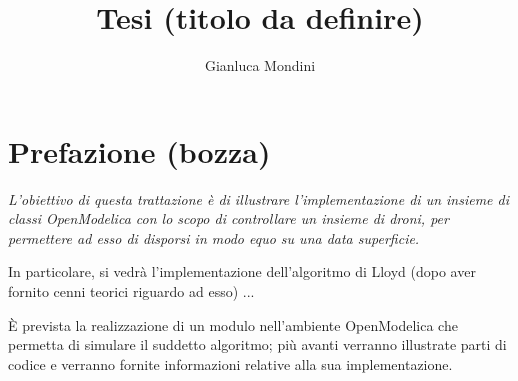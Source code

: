 \documentclass[11pt,a4paper]{report}
\author{Gianluca Mondini}
\title{Tesi (titolo da definire)}
\newcommand{\emptypage}[0]{\afterpage{\null\newpage}}
\begin{document}



\emptypage

\chapter*{Prefazione (bozza)}


{\em \large
L'obiettivo di questa trattazione è di illustrare l'implementazione di un insieme di classi OpenModelica con lo scopo di controllare un insieme di droni, per permettere ad esso di disporsi in modo equo su una data superficie.

In particolare, si vedrà l'implementazione dell'algoritmo di Lloyd (dopo aver fornito cenni teorici riguardo ad esso) ...

È prevista la realizzazione di un modulo nell'ambiente OpenModelica che permetta di simulare il suddetto algoritmo; più avanti verranno illustrate parti di codice e verranno fornite informazioni relative alla sua implementazione.
}
\pagebreak

\emptypage

\tableofcontents

\pagebreak



\end{document}
